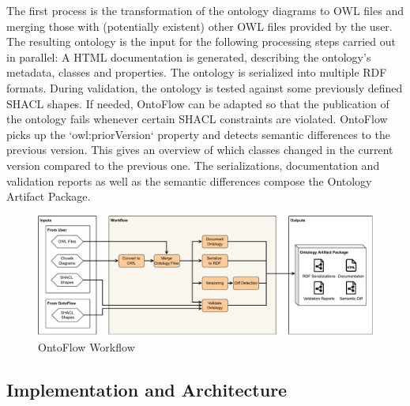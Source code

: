 \documentclass[runningheads]{llncs}
\begin{document}
The first process is the transformation of the ontology diagrams to OWL files and merging those with (potentially existent) other OWL files provided by the user. The resulting ontology is the input for the following processing steps carried out in parallel:
A HTML documentation is generated, describing the ontology's metadata, classes and properties. The ontology is serialized into multiple RDF formats. During validation, the ontology is tested against some previously defined SHACL shapes. If needed, OntoFlow can be adapted so that the publication of the ontology fails whenever certain SHACL constraints are violated.
OntoFlow picks up the `owl:priorVersion` property and detects semantic differences to the previous version. This gives an overview of which classes changed in the current version compared to the previous one. The serializations, documentation and validation reports as well as the semantic differences compose the Ontology Artifact Package.
\begin{figure}[htb]
	\centering
	\includegraphics[width=\textwidth] {workflow_landscape.pdf}
	\caption{OntoFlow Workflow}\label{fig:workflow}
\end{figure}

\subsection{Implementation and Architecture}
\end{document}
